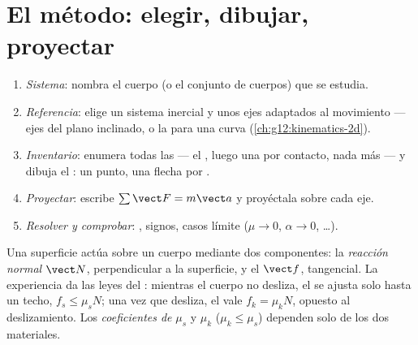 \section{El método: elegir, dibujar, proyectar}

\begin{method}\label{met:g12:newtons-laws:method}
\begin{enumerate}
  \item \emph{Sistema}: nombra el cuerpo (o el conjunto de cuerpos) que se estudia.
  \item \emph{Referencia}: elige un sistema inercial y unos ejes adaptados al
        movimiento --- ejes del plano inclinado, o la  para una curva
        (\cref{ch:g12:kinematics-2d}).
  \item \emph{Inventario}: enumera todas las  --- el , luego una  por
        contacto, nada más --- y dibuja el : un punto, una flecha
        por .
  \item \emph{Proyectar}: escribe $\sum \vect F = m\vect a$ y proyéctala sobre cada
        eje.
  \item \emph{Resolver y comprobar}: , signos, casos límite ($\mu \to 0$,
        $\alpha \to 0$, \dots).
\end{enumerate}
\end{method}

\begin{definition}\label{def:g12:newtons-laws:friction}
Una superficie actúa sobre un cuerpo mediante dos componentes: la \emph{reacción
normal} $\vect N$, perpendicular a la superficie, y el
 $\vect f$, tangencial. La experiencia da las leyes del : mientras
el cuerpo no desliza, el  se ajusta solo hasta un techo,
$f_s \leq \mu_s N$; una vez que desliza, el  vale $f_k = \mu_k N$,
opuesto al deslizamiento. Los \emph{coeficientes de }%
 $\mu_s$ y $\mu_k$ ($\mu_k \leq \mu_s$) dependen solo
de los dos materiales.
\end{definition}


